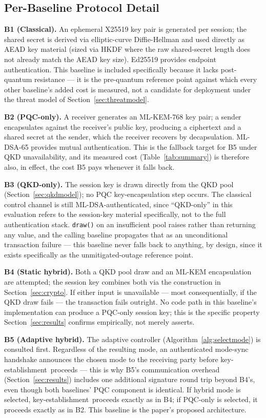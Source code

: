 \documentclass[journal]{IEEEtran}
\newcommand{\keyest}{key-establishment}
\begin{document}
\subsection{Per-Baseline Protocol Detail}

\textbf{B1 (Classical).} An ephemeral X25519 key pair is generated per session; the shared secret is derived via elliptic-curve Diffie-Hellman and used directly as AEAD key material (sized via HKDF where the raw shared-secret length does not already match the AEAD key size). Ed25519 provides endpoint authentication. This baseline is included specifically because it lacks post-quantum resistance --- it is the pre-quantum reference point against which every other baseline's added cost is measured, not a candidate for deployment under the threat model of Section~\ref{sec:threatmodel}.

\textbf{B2 (PQC-only).} A receiver generates an ML-KEM-768 key pair; a sender encapsulates against the receiver's public key, producing a ciphertext and a shared secret at the sender, which the receiver recovers by decapsulation. ML-DSA-65 provides mutual authentication. This is the fallback target for B5 under QKD unavailability, and its measured cost (Table~\ref{tab:summary}) is therefore also, in effect, the cost B5 pays whenever it falls back.

\textbf{B3 (QKD-only).} The session key is drawn directly from the QKD pool (Section~\ref{sec:qkdmodel}); no PQC key-encapsulation step occurs. The classical control channel is still ML-DSA-authenticated, since ``QKD-only'' in this evaluation refers to the session-key material specifically, not to the full authentication stack. \texttt{draw()} on an insufficient pool raises rather than returning any value, and the calling baseline propagates that as an unconditional transaction failure --- this baseline never falls back to anything, by design, since it exists specifically as the unmitigated-outage reference point.

\textbf{B4 (Static hybrid).} Both a QKD pool draw and an ML-KEM encapsulation are attempted; the session key combines both via the construction in Section~\ref{sec:crypto}. If either input is unavailable --- most consequentially, if the QKD draw fails --- the transaction fails outright. No code path in this baseline's implementation can produce a PQC-only session key; this is the specific property Section~\ref{sec:results} confirms empirically, not merely asserts.

\textbf{B5 (Adaptive hybrid).} The adaptive controller (Algorithm~\ref{alg:selectmode}) is consulted first. Regardless of the resulting mode, an authenticated mode-sync handshake announces the chosen mode to the receiving party before \keyest\ proceeds --- this is why B5's communication overhead (Section~\ref{sec:results}) includes one additional signature round trip beyond B4's, even though both baselines' PQC component is identical. If hybrid mode is selected, \keyest\ proceeds exactly as in B4; if PQC-only is selected, it proceeds exactly as in B2. This baseline is the paper's proposed architecture.
\end{document}
